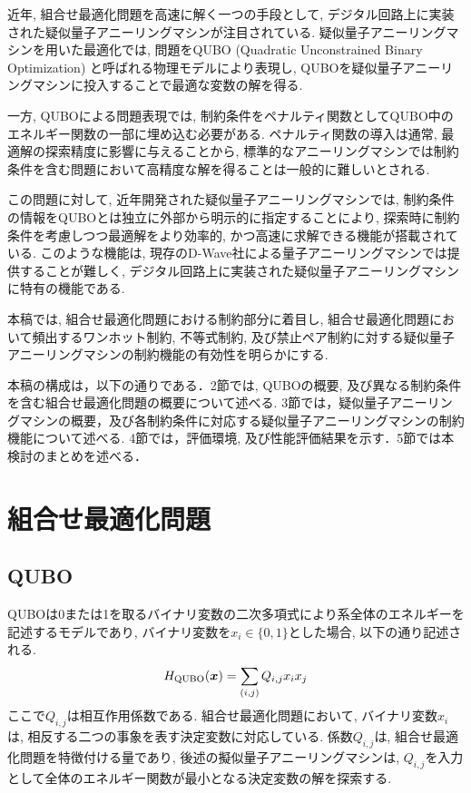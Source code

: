 \documentclass[submit,techrep,noauthor]{ipsj}
\begin{document}
近年, 組合せ最適化問題を高速に解く一つの手段として, デジタル回路上に実装された疑似量子アニーリングマシンが注目されている. 疑似量子アニーリングマシンを用いた最適化では, 問題をQUBO (Quadratic Unconstrained Binary Optimization) と呼ばれる物理モデルにより表現し, QUBOを疑似量子アニーリングマシンに投入することで最適な変数の解を得る.

一方, QUBOによる問題表現では, 制約条件をペナルティ関数としてQUBO中のエネルギー関数の一部に埋め込む必要がある. ペナルティ関数の導入は通常, 最適解の探索精度に影響に与えることから, 標準的なアニーリングマシンでは制約条件を含む問題において高精度な解を得ることは一般的に難しいとされる\cite{ozeki, onoda2}.

この問題に対して, 近年開発された疑似量子アニーリングマシンでは, 制約条件の情報をQUBOとは独立に外部から明示的に指定することにより, 探索時に制約条件を考慮しつつ最適解をより効率的, かつ高速に求解できる機能が搭載されている\cite{takano, da3}. このような機能は, 現存のD-Wave社による量子アニーリングマシンでは提供することが難しく, デジタル回路上に実装された疑似量子アニーリングマシンに特有の機能である. 

本稿では, 組合せ最適化問題における制約部分に着目し, 組合せ最適化問題において頻出するワンホット制約, 不等式制約, 及び禁止ペア制約に対する疑似量子アニーリングマシンの制約機能の有効性を明らかにする.

本稿の構成は，以下の通りである．2節では, QUBOの概要, 及び異なる制約条件を含む組合せ最適化問題の概要について述べる. 3節では，疑似量子アニーリングマシンの概要，及び各制約条件に対応する疑似量子アニーリングマシンの制約機能について述べる. 4節では，評価環境, 及び性能評価結果を示す．5節では本検討のまとめを述べる．

\section{組合せ最適化問題}

\subsection{QUBO}
QUBOは0または1を取るバイナリ変数の二次多項式により系全体のエネルギーを記述するモデルであり, バイナリ変数を$x_{i}\in\{0, 1\}$とした場合, 以下の通り記述される.
\begin{equation}
H_{\rm{QUBO}}(\bm{x}) = \sum_{(i,j)} Q_{i,j}x_{i}x_{j}
\label{H_qubo}
\end{equation}
ここで$Q_{i,j}$は相互作用係数である. 組合せ最適化問題において, バイナリ変数$x_{i}$は, 相反する二つの事象を表す決定変数に対応している. 係数$Q_{i,j}$は, 組合せ最適化問題を特徴付ける量であり, 後述の擬似量子アニーリングマシンは, $Q_{i,j}$を入力として全体のエネルギー関数が最小となる決定変数の解を探索する. 
\end{document}
